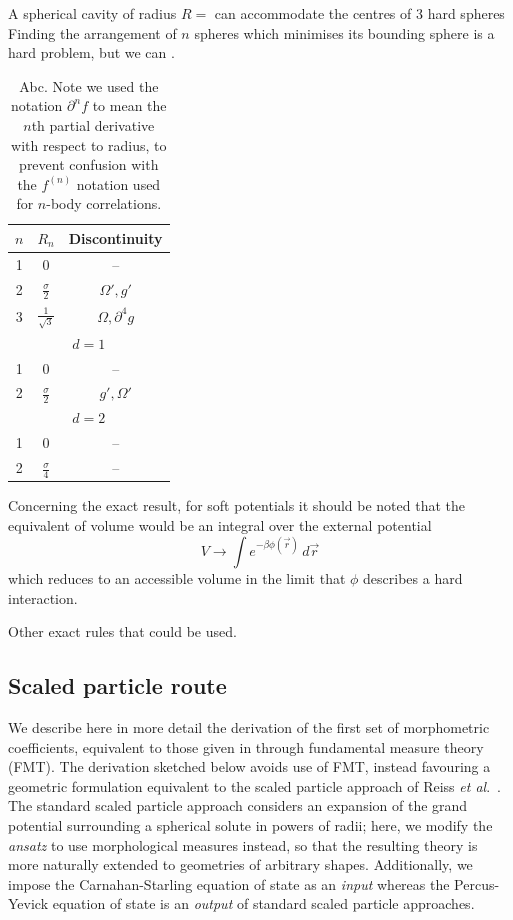 \documentclass[11pt]{report}
\begin{document}
A spherical cavity of radius $R=$ can accommodate the centres of 3 hard spheres
Finding the arrangement of $n$ spheres which minimises its bounding sphere is a hard problem, but we can .
\begin{table}
  \begin{minipage}[b]{\linewidth}
  \centering
  \begin{tabular}{ccc}
    \toprule
    $n$ & $R_n$ & Discontinuity \\
    \midrule
    1 & 0 & -- \\
    2 & $\frac{\sigma}{2}$ & $\Omega', g'$ \\
    3 & $\frac{1}{\sqrt{3}}$ & $\Omega, \partial^4 g$ \\
    \multicolumn{3}{c}{$d = 1$} \\
    \midrule
    1 & 0 & -- \\
    2 & $\frac{\sigma}{2}$ & $g', \Omega'$ \\
    \midrule
    \multicolumn{3}{c}{$d = 2$} \\
    \midrule
    1 & 0 & -- \\
    2 & $\frac{\sigma}{4}$ & -- \\
    \bottomrule
  \end{tabular}
  \end{minipage}
  \caption{Abc.
    Note we used the notation $\partial^n f$ to mean the $n$th partial derivative with respect to radius, to prevent confusion with the $f^{(n)}$ notation used for $n$-body correlations.}
\end{table}

Concerning the exact result, for soft potentials it should be noted that the equivalent of volume would be an integral over the external potential
\begin{equation}
  V \to \int e^{-\beta \phi(\vec{r})} \, d\vec{r}
\end{equation}
which reduces to an accessible volume in the limit that $\phi$ describes a hard interaction.

Other exact rules that could be used.

\subsection{Scaled particle route}

We describe here in more detail the derivation of the first set of morphometric coefficients, equivalent to those given in \cite{Hansen-Goos2006} through fundamental measure theory (FMT).
The derivation sketched below avoids use of FMT, instead favouring a geometric formulation equivalent to the scaled particle approach of Reiss \emph{et al}.\ \cite{Reiss1959,Reiss1960}.
The standard scaled particle approach considers an expansion of the grand potential surrounding a spherical solute in powers of radii; here, we modify the \emph{ansatz} to use morphological measures instead, so that the resulting theory is more naturally extended to geometries of arbitrary shapes.
Additionally, we impose the Carnahan-Starling equation of state as an \emph{input} whereas the Percus-Yevick equation of state is an \textit{output} of standard scaled particle approaches.
\end{document}
